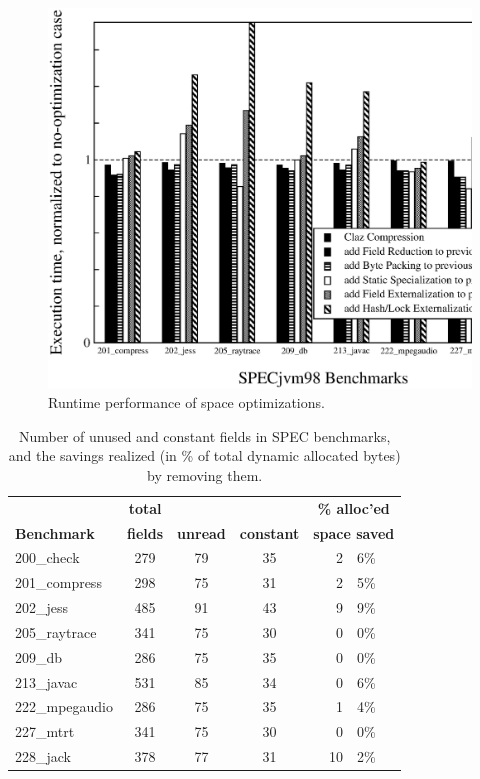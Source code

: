 \documentclass{acmconf}
\begin{document}
\begin{figure}
\includegraphics[scale=0.32,clip=true]{Figures/oopsla-speed.eps}
\caption{Runtime performance of space optimizations.}
\label{fig:space}
\end{figure}

\begin{table}
\begin{tabular}{lcccr@{.}l}
&\bf total&&&\multicolumn{2}{c}{\bf\% alloc'ed}\\
\bf Benchmark &\bf fields &\bf unread &\bf constant &
\multicolumn{2}{c}{\bf space saved} \\\hline
200\_check      & 279 &   79   &   35   &  2&6\% \\
201\_compress   & 298 &   75   &   31   &  2&5\% \\
202\_jess       & 485 &   91   &   43   &  9&9\% \\
205\_raytrace   & 341 &   75   &   30   &  0&0\% \\
209\_db         & 286 &   75   &   35   &  0&0\% \\
213\_javac      & 531 &   85   &   34   &  0&6\% \\
222\_mpegaudio  & 286 &   75   &   35   &  1&4\% \\
227\_mtrt       & 341 &   75   &   30   &  0&0\% \\
228\_jack       & 378 &   77   &   31   & 10&2\% \\
\end{tabular}
\caption{Number of unused and constant fields in SPEC benchmarks,
  and the savings realized (in \% of total dynamic allocated bytes) by
  removing them.}
\label{tab:const-unused}
\end{table}
\end{document}
